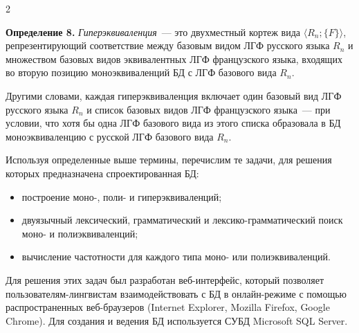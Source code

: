 \begin{multicols}{2}


\pagebreak



  \noindent
  \textbf{Определение 8.} \textit{Гиперэквиваленция}~--- это двухместный
кортеж вида $\langle R_n; \{F\}\rangle$, репрезентирующий соответствие между
базовым видом ЛГФ русского языка $R_n$ и множеством базовых видов
эквивалентных ЛГФ французского языка, входящих во вторую позицию
моноэквиваленций БД с ЛГФ базового вида $R_n$.

  Другими словами, каждая гиперэквиваленция включает один базовый вид
ЛГФ русского языка $R_n$ и список базовых видов ЛГФ французского языка~---
при условии, что хотя бы одна ЛГФ базового вида из этого списка образовала в
БД моноэквиваленцию с русской ЛГФ базового вида $R_n$.

  Используя определенные выше термины, перечислим те задачи, для решения
которых предназначена спроектированная БД:
  \begin{itemize}
\item построение моно-, поли- и гиперэквиваленций;
\item двуязычный лексический, грамматический и лексико-грамматический
поиск моно- и полиэквиваленций;
\item вычисление частотности для каждого типа моно- или
полиэквиваленций.
  \end{itemize}

  Для решения этих задач был разработан веб-интерфейс, который позволяет
поль\-зо\-ва\-те\-лям-линг\-вис\-там взаимодействовать с БД в он\-лайн-ре\-жи\-ме с
помощью распространенных веб-брау\-зе\-ров (Internet Explorer, Mozilla Firefox,
Google Chrome). Для создания и ведения БД используется СУБД Microsoft SQL
Server.


\end{multicols}

